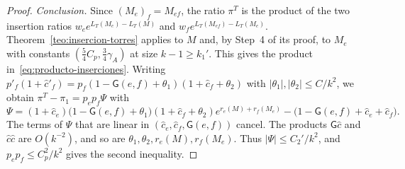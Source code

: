 \begin{proof}
\emph{Conclusion.} Since $(M_e)_f=M_{ef}$, the ratio $\pi^T$ is the product of the two insertion ratios
$w_ee^{L_T(M_e)-L_T(M)}$ and $w_fe^{L_T(M_{ef})-L_T(M_e)}$. Theorem~\ref{teo:insercion-torres} applies to
$M$ and, by Step~4 of its proof, to $M_e$ with constants $(\tfrac54C_p,\tfrac34\gamma_A)$ at size
$k-1\ge k_1'$. This gives the product in~\eqref{eq:producto-inserciones}. Writing
$p'_f(1+\hat c'_f)=p_f(1-\mathsf G(e,f)+\theta_1)(1+\hat c_f+\theta_2)$ with
$|\theta_1|,|\theta_2|\le C/k^2$, we obtain $\pi^T-\pi_1=p_ep_f\Psi$ with
\begin{equation}\label{eq:psi-dos-casillas}
 \Psi=(1+\hat c_e)\bigl(1-\mathsf G(e,f)+\theta_1\bigr)(1+\hat c_f+\theta_2)e^{r_e(M)+r_f(M_e)}
      -\bigl(1-\mathsf G(e,f)+\hat c_e+\hat c_f\bigr).
\end{equation}
The terms of $\Psi$ that are linear in $(\hat c_e,\hat c_f,\mathsf G(e,f))$ cancel. The products
$\mathsf G\hat c$ and $\hat c\hat c$ are $O(k^{-2})$, and so are $\theta_1,\theta_2,r_e(M),r_f(M_e)$.
Thus $|\Psi|\le C_2'/k^2$, and $p_ep_f\le C_p^2/k^2$ gives the second inequality.
\end{proof}
